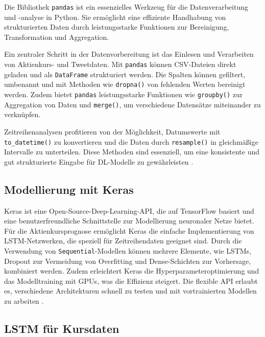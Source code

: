 Die Bibliothek \texttt{pandas} ist ein essenzielles Werkzeug für die Datenverarbeitung und -analyse in Python. Sie ermöglicht eine effiziente Handhabung von strukturierten Daten durch leistungsstarke Funktionen zur Bereinigung, Transformation und Aggregation.

Ein zentraler Schritt in der Datenvorbereitung ist das Einlesen und Verarbeiten von Aktienkurs- und Tweetdaten. Mit \texttt{pandas} können \ac{CSV}-Dateien direkt geladen und als \texttt{DataFrame} strukturiert werden. Die Spalten können gefiltert, umbenannt und mit Methoden wie \texttt{dropna()} von fehlenden Werten bereinigt werden. Zudem bietet \texttt{pandas} leistungsstarke Funktionen wie \texttt{groupby()} zur Aggregation von Daten und \texttt{merge()}, um verschiedene Datensätze miteinander zu verknüpfen.

Zeitreihenanalysen profitieren von der Möglichkeit, Datumswerte mit \texttt{to\_datetime()} zu konvertieren und die Daten durch \texttt{resample()} in gleichmäßige Intervalle zu unterteilen. Diese Methoden sind essenziell, um eine konsistente und gut strukturierte Eingabe für \ac{DL}-Modelle zu gewährleisten \autocite{article_pandas}.

\subsection{Modellierung mit Keras}\label{sec:modellierung-keras}

Keras ist eine Open-Source-Deep-Learning-API, die auf TensorFlow basiert und eine benutzerfreundliche Schnittstelle zur Modellierung neuronaler Netze bietet. Für die Aktienkursprognose ermöglicht Keras die einfache Implementierung von \ac{LSTM}-Netzwerken, die speziell für Zeitreihendaten geeignet sind. Durch die Verwendung von \texttt{Sequential}-Modellen können mehrere Elemente, wie \acp{LSTM}, Dropout zur Vermeidung von Overfitting und Dense-Schichten zur Vorhersage, kombiniert werden. Zudem erleichtert Keras die Hyperparameteroptimierung und das Modelltraining mit GPUs, was die Effizienz steigert. Die flexible API erlaubt es, verschiedene Architekturen schnell zu testen und mit vortrainierten Modellen zu arbeiten \autocite{heaton2022applicationsdeepneuralnetworks}.

\subsection{\acs{LSTM} für Kursdaten}\label{sec:theorie_lstm}

